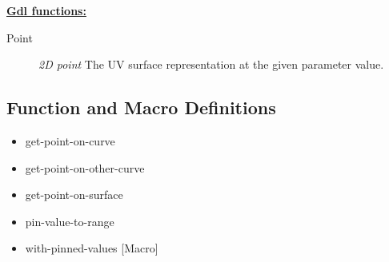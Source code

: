 \documentclass [11pt]{book}
\begin{document}
\begin{itemize}
\begin{description}

\end{description}








\textbf{
\underline{Gdl functions:}}

\begin{description}

\item [Point]
\emph{2D point} The UV surface representation at the given parameter value.


\end{description}







\end{itemize}



\subsection{Function and Macro Definitions}

\label{subsec:functionandmacrodefinitions}



\begin{itemize}

\item {}get-point-on-curve





\item {}get-point-on-other-curve





\item {}get-point-on-surface





\item {}pin-value-to-range





\item {}with-pinned-values [Macro]





\end{itemize}
\end{document}
